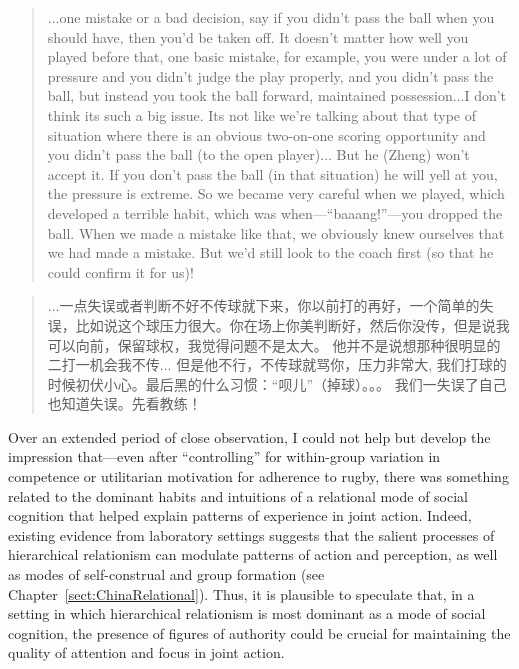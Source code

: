 \begin{CJK}{UTF8}{gbsn}
  \begin{quote}
     ...one mistake or a bad decision, say if you didn't pass the ball when you should have, then you'd be taken off.  It doesn't matter how well you played before that, one basic mistake, for example, you were under a lot of pressure and you didn't judge the play properly, and you didn't pass the ball, but instead you took the ball forward, maintained possession...I don't think its such a big issue.
     Its not like we're talking about that type of situation where there is an obvious two-on-one scoring opportunity and you didn't pass the ball (to the open player)...
     But he (Zheng) won't accept it.  If you don't pass the ball (in that situation) he will yell at you, the pressure is extreme.  So we became very careful when we played, which developed a terrible habit, which was when---``baaang!''---you dropped the ball. When we made a mistake like that, we obviously knew ourselves that we had made a mistake.  But we'd still look to the coach first (so that he could confirm it for us)!
               \end{quote}

       \begin{quote}
            ...一点失误或者判断不好不传球就下来，你以前打的再好，一个简单的失误，比如说这个球压力很大。你在场上你美判断好，然后你没传，但是说我可以向前，保留球权，我觉得问题不是太大。
           他并不是说想那种很明显的二打一机会我不传...
            但是他不行，不传球就骂你，压力非常大, 我们打球的时候初伏小心。最后黑的什么习惯：“呗儿”（掉球）。。。 我们一失误了自己也知道失误。先看教练！
      \end{quote}

Over an extended period of close observation, I could not help but develop the impression that---even after ``controlling'' for within-group variation in competence or utilitarian motivation for adherence to rugby, there was something related to the dominant habits and intuitions of a relational mode of social cognition that helped explain patterns of experience in joint action.  Indeed, existing evidence from laboratory settings suggests that the salient processes of hierarchical relationism can modulate patterns of action and perception, as well as modes of self-construal and group formation (see Chapter~\ref{sect:ChinaRelational}).  Thus, it is plausible to speculate that, in a setting in which hierarchical relationism is most dominant as a mode of social cognition, the presence of figures of authority could be crucial for maintaining the quality of attention and focus in joint action.


\end{CJK}
